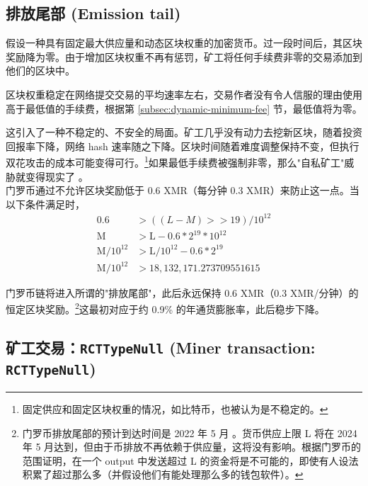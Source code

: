 {\subsection{排放尾部 (Emission tail)}
\label{subsec:emission-tail}

假设一种具有固定最大供应量和动态区块权重的加密货币。过一段时间后，其区块奖励降为零。由于增加区块权重不再有惩罚，矿工将任何手续费非零的交易添加到他们的区块中。

区块权重稳定在网络提交交易的平均速率左右，交易作者没有令人信服的理由使用高于最低值的手续费，根据第 \ref{subsec:dynamic-minimum-fee} 节，最低值将为零。

这引入了一种不稳定的、不安全的局面。矿工几乎没有动力去挖新区块，随着投资回报率下降，网络 hash 速率随之下降。区块时间随着难度调整保持不变，但执行双花攻击的成本可能变得可行。\footnote{固定供应和固定区块权重的情况，如比特币，也被认为是不稳定的。\cite{no-reward-instability}}如果最低手续费被强制非零，那么"自私矿工"\cite{selfish-miner}威胁就变得现实了 \cite{no-reward-instability}。\\

门罗币通过不允许区块奖励低于 0.6 XMR（每分钟 0.3 XMR）来防止这一点。当以下条件满足时，\vspace{.175cm}
\begin{align*}
               0.6 &> ((L-M) >> 19)/10^{12} \\
        \textrm{M} &> \textrm{L} - 0.6*2^{19}*10^{12} \\
\textrm{M}/10^{12} &> \textrm{L}/10^{12} - 0.6*2^{19} \\
\textrm{M}/10^{12} &> 18,132,171.273709551615
\end{align*}

门罗币链将进入所谓的"排放尾部"，此后永远保持 0.6 XMR（0.3 XMR/分钟）的恒定区块奖励。\footnote{门罗币排放尾部的预计到达时间是 2022 年 5 月 \cite{monero-tail-emission}。货币供应上限 L 将在 2024 年 5 月达到，但由于币排放不再依赖于供应量，这将没有影响。根据门罗币的范围证明，在一个 output 中发送超过 L 的资金将是不可能的，即使有人设法积累了超过那么多（并假设他们有能处理那么多的钱包软件）。}这最初对应于约 0.9\% 的年通货膨胀率，此后稳步下降。


\subsection{矿工交易：{\tt RCTTypeNull} (Miner transaction: {\tt RCTTypeNull})}
\label{subsec:miner-transaction} %

}

